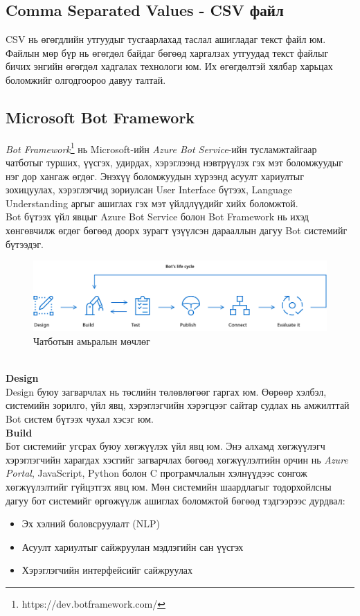 \subsection{Comma Separated Values - CSV файл}
CSV нь өгөгдлийн утгуудыг тусгаарлахад таслал ашигладаг текст файл юм. Файлын мөр бүр нь өгөгдөл байдаг бөгөөд харгалзах утгуудад текст файлыг бичих энгийн өгөгдөл хадгалах технологи юм. Их өгөгдөлтэй хялбар харьцах боломжийг олгодгоороо давуу талтай.
\subsection{Microsoft Bot Framework}
\textit{Bot Framework}\footnote{https://dev.botframework.com/} нь Microsoft-ийн \textit{Azure Bot Service}-ийн тусламжтайгаар чатботыг турших, үүсгэх, удирдах, хэрэглээнд нэвтрүүлэх гэх мэт боломжуудыг нэг дор хангаж өгдөг. Энэхүү боломжуудын хүрээнд асуулт хариултыг зохицуулах, хэрэглэгчид зориулсан User Interface бүтээх, Language Understanding аргыг ашиглах гэх мэт үйлдлүүдийг хийх боломжтой.
\\Bot бүтээх үйл явцыг Azure Bot Service болон Bot Framework нь ихэд хөнгөвчилж өгдөг бөгөөд доорх зурагт үзүүлсэн дарааллын дагуу Bot системийг бүтээдэг.
\begin{figure}[ht]
  \includegraphics[width=\textwidth]{images/azureSteps.png}
  \caption{Чатботын амьралын мөчлөг}\label{fig:lifeCycle}
\end{figure}
\\\textbf{Design}
\\Design буюу загварчлах нь төслийн төлөвлөгөөг гаргах юм. Өөрөөр хэлбэл, системийн зорилго, үйл явц, хэрэглэгчийн хэрэгцээг сайтар судлах нь амжилттай Bot систем бүтээх чухал хэсэг юм.
\\\textbf{Build}
\\Бот системийг угсрах буюу хөгжүүлэх үйл явц юм. Энэ алхамд хөгжүүлэгч хэрэглэгчийн харагдах хэсгийг загварчлах бөгөөд хөгжүүлэлтийн орчин нь \textit{Azure Portal}, JavaScript, Python болон C програмчлалын хэлнүүдээс сонгож хөгжүүлэлтийг гүйцэтгэх явц юм. Мөн системийн шаардлагыг тодорхойлсны дагуу бот системийг өргөжүүлж ашиглах боломжтой бөгөөд тэдгээрээс дурдвал:
\begin{itemize}
  \item Эх хэлний боловсруулалт (NLP)
  \item Асуулт хариултыг сайжруулан мэдлэгийн сан үүсгэх
  \item Хэрэглэгчийн интерфейсийг сайжруулах
\end{itemize}
